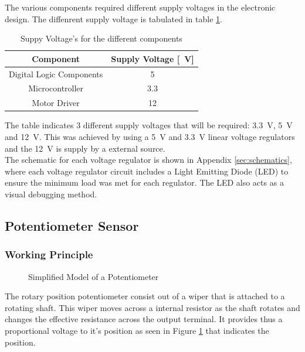The various components required different supply voltages in the electronic design. The diffenrent supply voltage is tabulated in table \ref{table:supplyVoltage}.

\begin{table}[]
	\centering
	\begin{tabular}{|c|c|}
		\hline
		Component & Supply Voltage [\SI{}{V}] \\
		\hline
		\hline
		Digital Logic Components & \SI{5}{} \\
		\hline
		Microcontroller & \SI{3.3}{} \\
		\hline
		Motor Driver & \SI{12}{} \\
		\hline
	\end{tabular}
	\caption{Suppy Voltage's for the different components}
	\label{table:supplyVoltage}
\end{table}


The table indicates 3 different supply voltages that will be required: \SI{3.3}{V}, \SI{5}{V} and \SI{12}{V}. This was achieved by using a \SI{5}{V} and \SI{3.3}{V} linear voltage regulators and the \SI{12}{V} is supply by a external source.\\

The schematic for each voltage regulator is shown in Appendix \ref{sec:schematics}, where each voltage regulator circuit includes a Light Emitting Diode (LED) to ensure the minimum load was met for each regulator. The LED also acts as a visual debugging method.

\subsection{Potentiometer Sensor}
\subsubsection{Working Principle}
\begin{figure}[h]
	\centering
	
	\caption{Simplified Model of a Potentiometer}
	\label{fig:potentiometer}
\end{figure}
The rotary position potentiometer consist out of a wiper that is attached to a rotating shaft. This wiper moves across a internal resistor as the shaft rotates and changes the effective resistance across the output terminal. It provides thus a proportional voltage to it's position as seen in Figure \ref{fig:potentiometer} that indicates the position.

